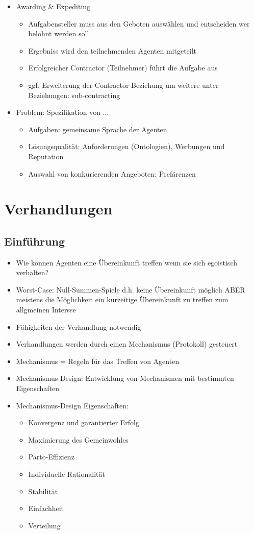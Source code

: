 \documentclass{article} %
\begin{document}
\begin{itemize}
\begin{itemize}
		\end{itemize}
		\item Awarding \& Expediting
		\begin{itemize}
			\item Aufgabensteller muss aus den Geboten auswählen und entscheiden wer belohnt werden soll
			\item Ergebniss wird den teilnehmenden Agenten mitgeteilt
			\item Erfolgreicher Contractor (Teilnehmer) führt die Aufgabe aus
			\item ggf. Erweiterung der Contractor Beziehung um weitere unter Beziehungen: sub-contracting
		\end{itemize}
		\item Problem: Spezifikation von ...
		\begin{itemize}
			\item Aufgaben: gemeinsame Sprache der Agenten
			\item Lösungsqualität: Anforderungen (Ontologien), Werbungen und Reputation
			\item Auswahl von konkurierenden Angeboten: Prefärenzen
		\end{itemize}
	\end{itemize}
	\section{Verhandlungen}
	\subsection{Einführung}
	\begin{itemize}
		\item Wie können Agenten eine Übereinkunft treffen wenn sie sich egoistisch verhalten?
		\item Worst-Case: Null-Summen-Spiele d.h. keine Übereinkunft möglich ABER meistens die Möglichkeit ein kurzeitige Übereinkunft zu treffen zum allgmeinen Intersse
		\item Fähigkeiten der Verhandlung notwendig
		\item Verhandlungen werden durch einen Mechanismus (Protokoll) gesteuert
		\item Mechanismus = Regeln für das Treffen von Agenten
		\item Mechanismus-Design: Entwicklung von Mechanismen mit bestimmten Eigenschaften
		\item Mechanismus-Design Eigenschaften:
		\begin{itemize}
			\item Konvergenz und garantierter Erfolg
			\item Maximierung des Gemeinwohles
			\item Parto-Effizienz
			\item Individuelle Rationalität
			\item Stabilität
			\item Einfachheit
			\item Verteilung
		\end{itemize} 
	\end{itemize}
\end{document}
